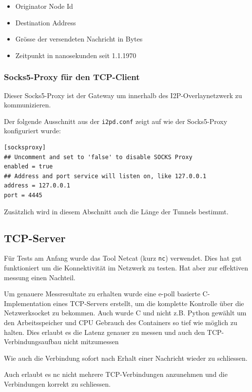 \begin{itemize}
    \item Originator Node Id
    \item Destination Address
    \item Grösse der versendeten Nachricht in Bytes
    \item Zeitpunkt in nanosekunden seit 1.1.1970 
\end{itemize}


\subsubsection{Socks5-Proxy für den TCP-Client}

Dieser Socks5-Proxy ist der Gateway um innerhalb des I2P-Overlaynetzwerk zu kommunizieren.

Der folgende Ausschnitt aus der \lstinline|i2pd.conf| zeigt auf wie der Socks5-Proxy konfiguriert wurde:

\begin{lstlisting}
[socksproxy]
## Uncomment and set to 'false' to disable SOCKS Proxy
enabled = true
## Address and port service will listen on, like 127.0.0.1
address = 127.0.0.1
port = 4445
\end{lstlisting}

Zusätzlich wird in diesem Abschnitt auch die Länge der Tunnels bestimmt.

\subsection{TCP-Server}

Für Tests am Anfang wurde das Tool Netcat (kurz \lstinline|nc|) verwendet.
Dies hat gut funktioniert um die Konnektivität im Netzwerk zu testen. Hat aber zur effektiven messung einen Nachteil.

Um genauere Messresultate zu erhalten wurde eine e-poll basierte C-Implementation eines TCP-Servers erstellt, um die komplette Kontrolle über die Netzwerksocket zu bekommen.
Auch wurde C und nicht z.B. Python gewählt um den Arbeitsspeicher und CPU Gebrauch des Containers so tief wie möglich zu halten.
Dies erlaubt es die Latenz genauer zu messen und auch den TCP-Verbindungsaufbau nicht mitzumessen

Wie auch die Verbindung sofort nach Erhalt einer Nachricht wieder zu schliessen.

Auch erlaubt es nc nicht mehrere TCP-Verbindungen anzunehmen und die Verbindungen korrekt zu schliessen.

